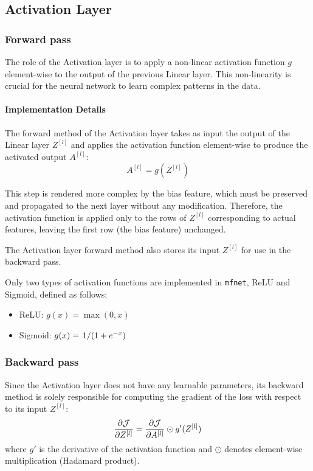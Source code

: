 \subsection{Activation Layer}
\subsubsection{Forward pass}
The role of the Activation layer is to apply a non-linear activation function $g$ element-wise to the output of the previous Linear layer. This non-linearity is crucial for the neural network to learn complex patterns in the data.

\paragraph{Implementation Details} The forward method of the Activation layer takes as input the output of the Linear layer $Z^{[l]}$ and applies the activation function element-wise to produce the activated output $A^{[l]}$:
\begin{equation}
    A^{[l]} = g(Z^{[l]})
\end{equation}

This step is rendered more complex by the bias feature, which must be preserved and propagated to the next layer without any modification. Therefore, the activation function is applied only to the rows of $Z^{[l]}$ corresponding to actual features, leaving the first row (the bias feature) unchanged.

The Activation layer forward method also stores its input $Z^{[l]}$ for use in the backward pass.

Only two types of activation functions are implemented in \texttt{mfnet}, ReLU and Sigmoid, defined as follows:
\begin{itemize}
    \item ReLU: $g(x) = \max(0, x)$
    \item Sigmoid: $g(x) = \flatfrac{1}{(1 + e^{-x})}$
\end{itemize}

\subsubsection{Backward pass}
Since the Activation layer does not have any learnable parameters, its backward method is solely responsible for computing the gradient of the loss with respect to its input $Z^{[l]}$:
\begin{equation}
    \pdv{\mathcal{J}}{Z^{[l]}} = \pdv{\mathcal{J}}{A^{[l]}} \odot g'(Z^{[l]})
\end{equation}
where $g'$ is the derivative of the activation function and $\odot$ denotes element-wise multiplication (Hadamard product).

